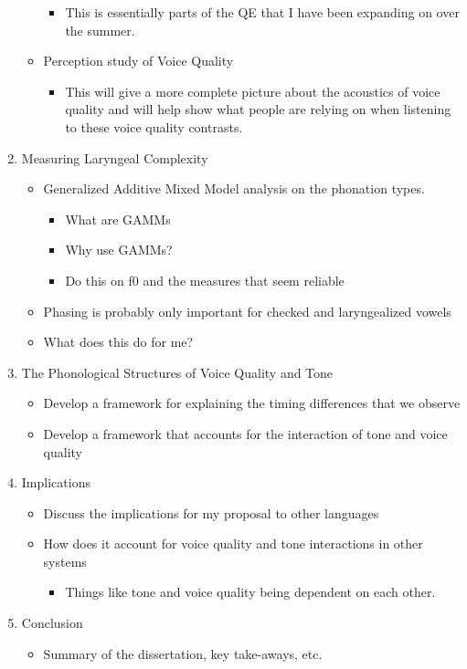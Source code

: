 \documentclass[12pt, letterpaper]{article}
\begin{document}
\begin{enumerate}
\begin{itemize}
\begin{itemize}
            \item This is essentially parts of the QE that I have been expanding on over the summer. 
        \end{itemize}
        \item Perception study of Voice Quality
        \begin{itemize}
            \item This will give a more complete picture about the acoustics of voice quality and will help show what people are relying on when listening to these voice quality contrasts. 
        \end{itemize}
    \end{itemize}
    \item Measuring Laryngeal Complexity
    \begin{itemize}
        \item Generalized Additive Mixed Model analysis on the phonation types. 
		\begin{itemize}
            \item What are GAMMs
            \item Why use GAMMs?
            \item Do this on f0 and the measures that seem reliable
        \end{itemize}
        \item Phasing is probably only important for checked and laryngealized vowels
        \item What does this do for me?
    \end{itemize}
    \item The Phonological Structures of Voice Quality and Tone
    \begin{itemize}
        \item Develop a framework for explaining the timing differences that we observe
        \item Develop a framework that accounts for the interaction of tone and voice quality
    \end{itemize}
    \item Implications
    \begin{itemize}
        \item Discuss the implications for my proposal to other languages
        \item How does it account for voice quality and tone interactions in other systems
        \begin{itemize}
            \item Things like tone and voice quality being dependent on each other. 
        \end{itemize}
    \end{itemize}
    \item Conclusion
    \begin{itemize}
        \item Summary of the dissertation, key take-aways, etc.
    \end{itemize}
\end{enumerate}
\end{document}
